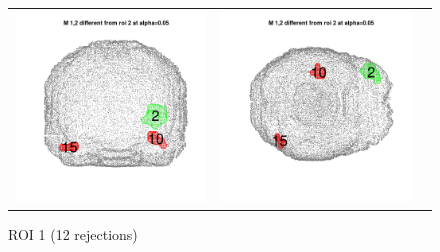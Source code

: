 \documentclass[12pt]{article}
\begin{document}
\begin{figure}[h]
\begin{tabular}{ccc}
\includegraphics[scale = 0.24]{../a7plots/d_2r_2_view2.png} & 
\includegraphics[scale = 0.24]{../a7plots/d_2r_2_view3.png} \\ 
\end{tabular}
\caption{ROI 1 (12 rejections)}
\end{figure}
\end{document}
